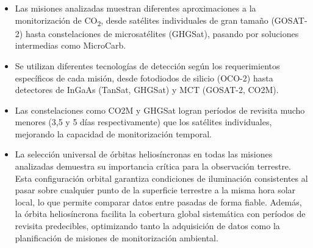 \begin{itemize}
    \item Las misiones analizadas muestran diferentes aproximaciones a la monitorización de CO\textsubscript{2}, desde satélites individuales de gran tamaño (GOSAT-2) hasta constelaciones de microsatélites (GHGSat), pasando por soluciones intermedias como MicroCarb.
    \item Se utilizan diferentes tecnologías de detección según los requerimientos específicos de cada misión, desde fotodiodos de silicio (OCO-2) hasta detectores de InGaAs (TanSat, GHGSat) y MCT (GOSAT-2, CO2M).
    \item Las constelaciones como CO2M y GHGSat logran períodos de revisita mucho menores (3,5 y 5 días respectivamente) que los satélites individuales, mejorando la capacidad de monitorización temporal.
    \item La selección universal de órbitas heliosíncronas en todas las misiones analizadas demuestra su importancia crítica para la observación terrestre. Esta configuración orbital garantiza condiciones de iluminación consistentes al pasar sobre cualquier punto de la superficie terrestre a la misma hora solar local, lo que permite comparar datos entre pasadas de forma fiable. Además, la órbita heliosíncrona facilita la cobertura global sistemática con períodos de revisita predecibles, optimizando tanto la adquisición de datos como la planificación de misiones de monitorización ambiental.

\end{itemize}
